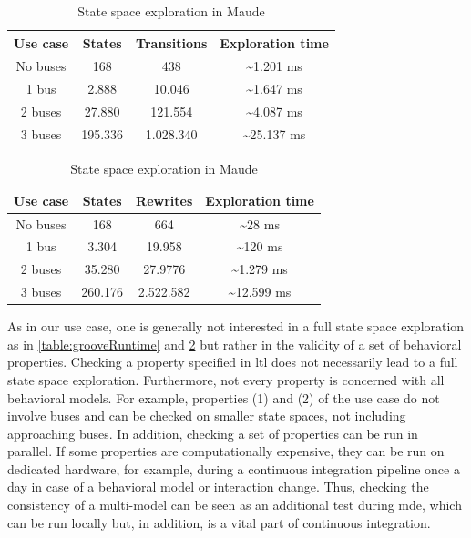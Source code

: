 \documentclass{jot}
\begin{document}
\begin{table}[ht]
\centering

\begin{tabular}{|c || c | c | c |}
 \hline
 Use case & States & Transitions & Exploration time \\
 \hline\hline
 No buses & 168 & 438 & \textasciitilde 1.201 ms \\
 \hline
 1 bus & 2.888 & 10.046 & \textasciitilde 1.647 ms \\
 \hline
 2 buses & 27.880 & 121.554 & \textasciitilde 4.087 ms \\
 \hline
 3 buses & 195.336 & 1.028.340 & \textasciitilde 25.137 ms \\
 \hline
\end{tabular}
\caption[State space exploration in Groove]{State space exploration in Groove}
\label{table:grooveRuntime}

\smallskip

\begin{tabular}{|c || c | c | c |}
 \hline
 Use case & States & Rewrites & Exploration time \\
 \hline\hline
 No buses & 168 & 664 & \textasciitilde 28 ms \\
 \hline
 1 bus & 3.304 & 19.958 & \textasciitilde 120 ms \\
 \hline
 2 buses & 35.280 & 27.9776 & \textasciitilde 1.279 ms \\
 \hline
 3 buses & 260.176 & 2.522.582 & \textasciitilde 12.599 ms \\
 \hline
\end{tabular}
\caption[State space exploration in Maude]{State space exploration in Maude}
\label{table:maudeRuntime}

\end{table}

As in our use case, one is generally not interested in a full state space exploration as in \cref{table:grooveRuntime} and \cref{table:maudeRuntime} but rather in the validity of a set of behavioral properties.
Checking a property specified in \gls*{ltl} does not necessarily lead to a full state space exploration.
Furthermore, not every property is concerned with all behavioral models.
For example, properties (1) and (2) of the use case do not involve buses and can be checked on smaller state spaces, not including approaching buses.
In addition, checking a set of properties can be run in parallel.
If some properties are computationally expensive, they can be run on dedicated hardware, for example, during a continuous integration pipeline once a day in case of a behavioral model or interaction change.
Thus, checking the consistency of a multi-model can be seen as an additional test during \gls*{mde}, which can be run locally but, in addition, is a vital part of continuous integration.
\end{document}
